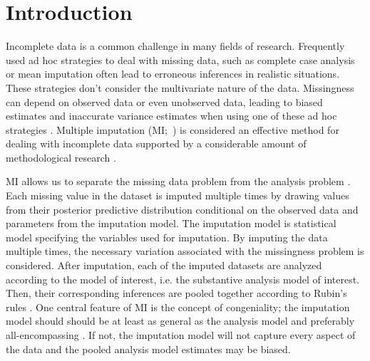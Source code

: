 \documentclass[10pt, a4paper, titlepage]{article}
\begin{document}
\newpage
\tableofcontents
\newpage
\section{Introduction}
Incomplete data is a common challenge in many fields of research. Frequently used ad hoc strategies to deal with missing data, such as complete case analysis or mean imputation often lead to erroneous inferences in realistic situations. These strategies don't consider the multivariate nature of the data. Missingness can depend on observed data or even unobserved data, leading to biased estimates and inaccurate variance estimates when using one of these ad hoc strategies \citep{buurenFlexibleImputationMissing2018, kang2013, enders2017, austin2021, little2002}. Multiple imputation (MI;~) is considered an effective method for dealing with incomplete data supported by a considerable amount of methodological research \citep{mistlerComparisonJointModel2017, buurenFlexibleImputationMissing2018, enders2017, burgette2010, austin2021, audigier2018, vanbuuren2007, grund2021, hughes2014, little2002}.

MI allows us to separate the missing data problem from the analysis problem \citep{mistlerComparisonJointModel2017, buurenFlexibleImputationMissing2018, enders2017, burgette2010, austin2021, audigier2018, vanbuuren2007, grund2021, hughes2014, little2002}. Each missing value in the dataset is imputed multiple times by drawing values from their posterior predictive distribution conditional on the observed data and parameters from the imputation model. The imputation model is statistical model specifying the variables used for imputation. By imputing the data multiple times, the necessary variation associated with the missingness problem is considered. After imputation, each of the imputed datasets are analyzed according to the model of interest, i.e. the substantive analysis model of interest. Then, their corresponding inferences are pooled together according to Rubin's rules \citep{buurenFlexibleImputationMissing2018, austin2021, rubin1987, carpenter2013}. One central feature of MI is the concept of congeniality; the imputation model should should be at least as general as the analysis model and preferably all-encompassing \citep{grund2018, enders2018, meng1994multiple, bartlett2015, grund2016, little2002}. If not, the imputation model will not capture every aspect of the data and the pooled analysis model estimates may be biased. 
\end{document}
